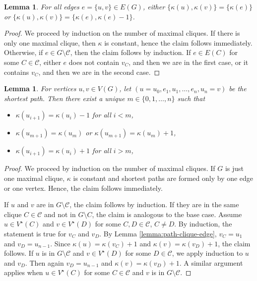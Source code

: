\documentclass[a4paper, 11pt]{amsart}
\numberwithin{theorem}{section}
\newtheorem{lemma}[theorem]{Lemma}
\newcommand{\cC}{\mathcal{C}}
\begin{document}
\begin{lemma}\label{lemma:kappa-edge-step}
    For all edges $e =\{u,v\}\in E(G)$, either $\lbrace \kappa(u),\kappa(v)\rbrace = \lbrace \kappa (e)\rbrace$ or $\lbrace \kappa(u),\kappa(v)\rbrace = \lbrace \kappa (e), \kappa (e)-1\rbrace$.
\end{lemma}
\begin{proof}
    We proceed by induction on the number of maximal cliques. If there
    is only one maximal clique, then $\kappa$ is constant, hence the
    claim follows immediately. Otherwise, if $e\in G\setminus\mathcal
    C$, then the claim follows by induction. If $e\in E(C)$ for some
    $C\in \mathcal C$, either $e$ does not contain $v_C$, and then we
    are in the first case, or it contains $v_C$, and then we are in
    the second case. 
\end{proof}

\begin{lemma}\label{lemma:up-and-down}
    For vertices $u,v\in V(G)$, let $(u= u_0,e_1,u_1,\dots ,e_n,u_n=v)$ be the shortest path. Then there exist a unique $m\in \lbrace0,1,\dots, n\rbrace$ such that
    \begin{itemize}
        \item $\kappa(u_{i+1}) = \kappa(u_i)-1$ for all $i< m$,
        \item $\kappa(u_{m+1}) = \kappa(u_m)$ or $\kappa(u_{m+1}) = \kappa(u_m) +1$,
        \item $\kappa(u_{i+1}) = \kappa(u_i)+1$ for all $i> m$,
    \end{itemize}
\end{lemma}
\begin{proof}
    We proceed by induction on the number of maximal cliques. If $G$ is just one maximal clique, $\kappa$ is constant and shortest paths are formed only by one edge or one vertex. Hence, the claim follows immediately.
    
    If $u$ and $v$ are in $G\setminus\mathcal C$, the claim follows by
    induction. If they are in the same clique $C\in \mathcal C$ and
    not in $G\setminus C$, the claim is analogous to the base case.
    Assume $u\in V^\star (C)$ and $v\in V^\star(D)$ for some
    $C,D\in\mathcal C$, $C\neq D$. By induction, the statement is true
    for $v_C$ and $v_D$. By Lemma \ref{lemma:path-clique-edge}, $v_C =
    u_1$ and $v_D = u_{n-1}$. Since $\kappa(u) = \kappa(v_C)+1$ and
    $\kappa(v) = \kappa(v_D)+1$, the claim follows. If $u$ is in
    $G\setminus\mathcal C$ and $v\in V^\star(D)$ for some
    $D\in\mathcal C$, we apply induction to $u$ and $v_D$. Then again
    $v_D = u_{n-1}$ and $\kappa(v) = \kappa(v_D)+1$. A similar
    argument applies when $u \in V^\star(C)$ for some $C \in \cC$ and
    $v$ is in $G \setminus \cC$.
\end{proof}
\end{document}
